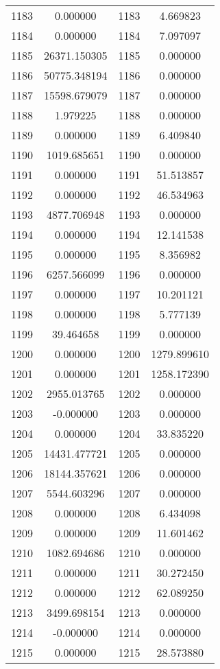 \documentclass[12pt]{article}
\begin{document}
\begin{longtable}{@{}cccc@{}}
1183 & 0.000000 & 1183 & 4.669823 \\
1184 & 0.000000 & 1184 & 7.097097 \\
1185 & 26371.150305 & 1185 & 0.000000 \\
1186 & 50775.348194 & 1186 & 0.000000 \\
1187 & 15598.679079 & 1187 & 0.000000 \\
1188 & 1.979225 & 1188 & 0.000000 \\
1189 & 0.000000 & 1189 & 6.409840 \\
1190 & 1019.685651 & 1190 & 0.000000 \\
1191 & 0.000000 & 1191 & 51.513857 \\
1192 & 0.000000 & 1192 & 46.534963 \\
1193 & 4877.706948 & 1193 & 0.000000 \\
1194 & 0.000000 & 1194 & 12.141538 \\
1195 & 0.000000 & 1195 & 8.356982 \\
1196 & 6257.566099 & 1196 & 0.000000 \\
1197 & 0.000000 & 1197 & 10.201121 \\
1198 & 0.000000 & 1198 & 5.777139 \\
1199 & 39.464658 & 1199 & 0.000000 \\
1200 & 0.000000 & 1200 & 1279.899610 \\
1201 & 0.000000 & 1201 & 1258.172390 \\
1202 & 2955.013765 & 1202 & 0.000000 \\
1203 & -0.000000 & 1203 & 0.000000 \\
1204 & 0.000000 & 1204 & 33.835220 \\
1205 & 14431.477721 & 1205 & 0.000000 \\
1206 & 18144.357621 & 1206 & 0.000000 \\
1207 & 5544.603296 & 1207 & 0.000000 \\
1208 & 0.000000 & 1208 & 6.434098 \\
1209 & 0.000000 & 1209 & 11.601462 \\
1210 & 1082.694686 & 1210 & 0.000000 \\
1211 & 0.000000 & 1211 & 30.272450 \\
1212 & 0.000000 & 1212 & 62.089250 \\
1213 & 3499.698154 & 1213 & 0.000000 \\
1214 & -0.000000 & 1214 & 0.000000 \\
1215 & 0.000000 & 1215 & 28.573880 \\

\end{longtable}
\end{document}
